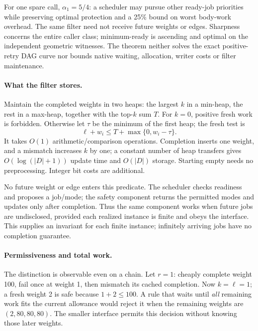 \documentclass[acmsmall,screen,review,anonymous]{acmart}
\begin{document}
For one spare call, $\alpha_1=5/4$: a scheduler may pursue other ready-job priorities while preserving optimal protection and a 25\% bound on worst body-work overhead. The same filter need not receive future weights or edges. Sharpness concerns the entire caller class; minimum-ready is ascending and optimal on the independent geometric witnesses. The theorem neither solves the exact positive-retry DAG curve nor bounds native waiting, allocation, writer costs or filter maintenance.

\paragraph{What the filter stores.}
Maintain the completed weights in two heaps: the largest $k$ in a min-heap, the rest in a max-heap, together with the top-$k$ sum $T$. For $k=0$, positive fresh work is forbidden. Otherwise let $\tau$ be the minimum of the first heap; the fresh test is
\[
 \ell+w_i\le T+\max\{0,w_i-\tau\}.
\]
It takes $O(1)$ arithmetic/comparison operations. Completion inserts one weight, and a mismatch increases $k$ by one; a constant number of heap transfers gives $O(\log(|D|+1))$ update time and $O(|D|)$ storage. Starting empty needs no preprocessing. Integer bit costs are additional.

No future weight or edge enters this predicate. The scheduler checks readiness and proposes a job/mode; the safety component returns the permitted modes and updates only after completion. Thus the same component works when future jobs are undisclosed, provided each realized instance is finite and obeys the interface. This supplies an invariant for each finite instance; infinitely arriving jobs have no completion guarantee.




\paragraph{Permissiveness and total work.}
The distinction is observable even on a chain. Let $r=1$: cheaply complete weight 100, fail once at weight 1, then mismatch its cached completion. Now $k=\ell=1$; a fresh weight 2 is safe because $1+2\le100$. A rule that waits until \emph{all} remaining work fits the current allowance would reject it when the remaining weights are $(2,80,80,80)$. The smaller interface permits this decision without knowing those later weights.
\end{document}
